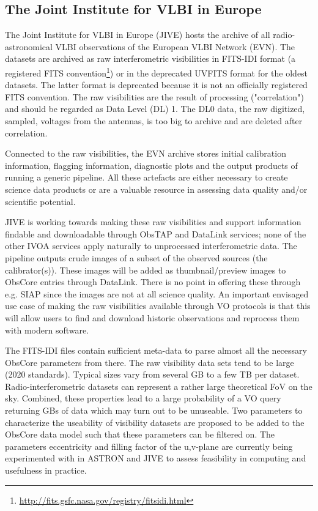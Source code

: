\documentclass[11pt,a4paper]{ivoa}
\begin{document}
\subsection{The Joint Institute for VLBI in Europe}
\label{sec:JIVE}
The Joint Institute for VLBI in Europe (JIVE) hosts the archive of all radio-astronomical VLBI observations of the European VLBI Network (EVN). The datasets are archived as raw interferometric visibilities in FITS-IDI format (a registered FITS convention\footnote{\url{ http://fits.gsfc.nasa.gov/registry/fitsidi.html}}) or in the deprecated UVFITS format for the oldest datasets. The latter format is deprecated because it is not an officially registered FITS convention. The raw visibilities are the result of processing ("correlation") and should be regarded as Data Level (DL) 1. The DL0 data, the raw digitized, sampled, voltages from the antennas, is too big to archive and are deleted after correlation.

Connected to the raw visibilities, the EVN archive stores initial calibration information, flagging information, diagnostic plots and the output products of running a generic pipeline. All these artefacts are either necessary to create science data products or are a valuable resource in assessing data quality and/or scientific potential.

JIVE is working towards making these raw visibilities and support information findable and downloadable through ObsTAP and DataLink services; none of the other IVOA services apply naturally to unprocessed interferometric data. The pipeline outputs crude images of a subset of the observed sources (the calibrator(s)). These images will be added as thumbnail/preview images to ObsCore entries through DataLink. There is no point in offering these through e.g. SIAP since the images are not at all science quality. An important envisaged use case of making the raw visibilities available through VO protocols is that this will allow users to find and download historic observations and reprocess them with modern software.

The FITS-IDI files contain sufficient meta-data to parse almost all the necessary ObsCore parameters from there. The raw visibility data sets tend to be large (2020 standards). Typical sizes vary from several GB to a few TB per dataset. Radio-interferometric datasets can represent a rather large theoretical FoV on the sky. Combined, these properties lead to a large probability of a VO query returning GBs of data which may turn out to be unuseable. Two parameters to characterize the useability of visibility datasets are proposed to be added to the ObsCore data model such that these parameters can be filtered on. The parameters eccentricity and filling factor of the u,v-plane are currently being experimented with in ASTRON and JIVE to assess feasibility in computing and usefulness in practice.
\end{document}
